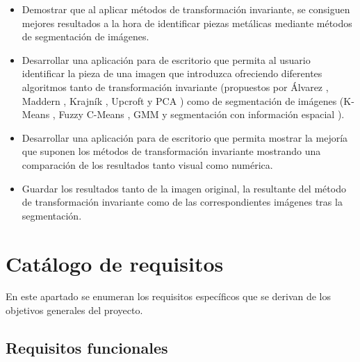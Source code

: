 \begin{itemize}
    \item Demostrar que al aplicar métodos de transformación invariante, se consiguen mejores resultados a la hora de identificar piezas metálicas mediante métodos de segmentación de imágenes.
    \item Desarrollar una aplicación para de escritorio que permita al usuario identificar la pieza de una imagen que introduzca ofreciendo diferentes algoritmos tanto de transformación invariante (propuestos por Álvarez \cite{alvarez2011}, Maddern \cite{maddern2014}, Krajník \cite{krajník2015}, Upcroft \cite{upcroft2014} y PCA \cite{pca2017}) como de segmentación de imágenes (K-Means \cite{MATLAB:2023bKmeans}, Fuzzy C-Means \cite{MATLAB:2023bFuzzy}, GMM \cite{MATLAB:2023bGMM} y segmentación con información espacial \cite{wang2012hmrf}).
    \item Desarrollar una aplicación para de escritorio que permita mostrar la mejoría que suponen los métodos de transformación invariante mostrando una comparación de los resultados tanto visual como numérica.
    \item Guardar los resultados tanto de la imagen original, la resultante del método de transformación invariante como de las correspondientes imágenes tras la segmentación.
\end{itemize}

\section{Catálogo de requisitos}\label{catalogo-de-requisitos}

En este apartado se enumeran los requisitos específicos que se derivan de los objetivos generales del proyecto.

\subsection{Requisitos funcionales}\label{requisitos-funcionales}

